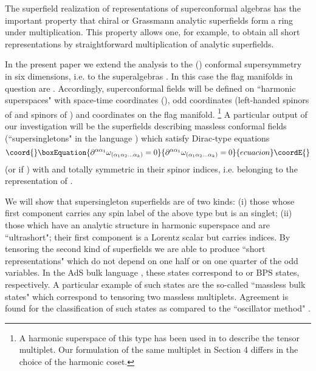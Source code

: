 \documentclass[a4paper,12pt]{article}
\begin{document}
The superfield realization of representations of superconformal algebras has
the important property that chiral or Grassmann analytic superfields form a ring
under multiplication. This property allows one, for example, to obtain all short
representations by straightforward multiplication of analytic superfields.

In the present paper we extend the analysis to the \coordHE{} 
(\coordHE{}) conformal supersymmetry in six dimensions, i.e. to the  
superalgebras \coordHE{}. In this case the flag manifolds in 
question are \coordHE{}. Accordingly, 
superconformal fields will be defined on ``harmonic superspaces" 
with space-time coordinates \coordHE{} (\coordHE{}), odd 
coordinates \coordHE{} (left-handed spinors of \coordHE{} and spinors of \coordHE{}) and coordinates 
\coordHE{} on the flag manifold. \footnote{A harmonic superspace of 
this type has been used in \cite{Howe} to describe the \coordHE{} 
tensor multiplet. Our formulation of the same multiplet in Section 
4 differs in the choice of the harmonic coset.} A particular 
output of our investigation will be the superfields describing 
massless conformal fields (``supersingletons" in the \coordHE{} 
language \cite{ff2}) which satisfy Dirac-type equations 
\begin{equation}\coord{}\boxEquation{\label{0}
  \partial^{\alpha\alpha_1} 
\omega_{(\alpha_1\alpha_2\ldots\alpha_k)} = 0 
}{\partial^{\alpha\alpha_1} 
\omega_{(\alpha_1\alpha_2\ldots\alpha_k)} = 0 
}{ecuacion}\coordE{}\end{equation}
(or \coordHE{} if \coordHE{}) with \myHighlight{$\partial^{\alpha\beta} = 
\partial_\mu (\gamma^\mu)^{\alpha\beta}$}\coordHE{} and \myHighlight{$\omega$}\coordHE{} totally symmetric 
in their spinor indices, i.e. belonging to the \coordHE{} 
representation of \coordHE{}.



We will show that supersingleton superfields are of two kinds: (i) 
those whose first component carries any spin label of the above 
type but is an \coordHE{} singlet; (ii) those which have 
an analytic structure in harmonic superspace and are 
``ultrashort"; their first component is a Lorentz scalar but 
carries  \coordHE{} indices. By tensoring the second 
kind of superfields we are able to produce ``short 
representations" which do not depend on one half or on one quarter 
of the odd variables. In the AdS bulk language \cite{FF}, these 
states correspond to \coordHE{} or \coordHE{} BPS states, respectively. A 
particular example of such states are the so-called ``massless 
bulk states" which correspond to tensoring two massless 
multiplets. Agreement is found for the classification of such 
states as compared to the ``oscillator method" \cite{GT}. 
\end{document}
